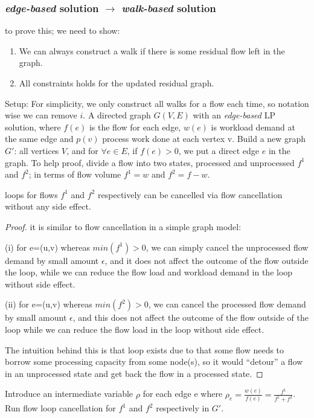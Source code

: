 \subsubsection{\emph{edge-based} solution $\rightarrow$ \emph{walk-based} solution}
to prove this; we need to show:
\begin{enumerate}
 \item We can always construct a walk if there is some residual flow left in the graph.
 \item All constraints holds for the updated residual graph.
 
\end{enumerate}

Setup: 
For simplicity, we only construct all walks for a flow each time, so notation wise we can remove $i$. A directed graph $G(V,E)$ with an \emph{edge-based} LP solution, where $f(e)$ is the flow for each edge, $w(e)$ is workload demand at the same edge and $p(v)$ process work done at each vertex v. Build a new graph $G'$: all vertices $V$, and for $\forall e\in E $, if $f(e) >0$, we put a direct edge $e$ in the graph. To help proof, divide a flow into two states, processed and unprocessed $f^1$ and $f^2$; in terms of flow volume $f^1=w$ and $f^2=f-w$. 
\begin{lemma} loops for flows $f^1$ and $f^2$ respectively can be cancelled via flow cancellation without any side effect. 
\end{lemma} 

\begin{proof} it is similar to flow cancellation in a simple graph model: 

(i) for e=(u,v) whereas $min(f^1) >0$, we can simply cancel the unprocessed flow demand by small amount $\epsilon$, and it does not affect the outcome of the flow outside the loop, while we can reduce the flow load and workload demand in the loop without side effect. 

(ii) for e=(u,v) whereas $min(f^2)>0$, we can cancel the processed flow demand by small amount $\epsilon$, and this does not affect the outcome of the flow outside of the loop while we can reduce the flow load in the loop without side effect. 

The intuition behind this is that loop exists due to that some flow needs to borrow some processing capacity from some node(s), so it would ``detour'' a flow in an unprocessed state and get back the flow in a processed state. 
\end{proof}

Introduce an intermediate variable $\rho$ for each edge e where $\rho_{e} = \frac{w(e)}{f(e)} = \frac{ f^1} {f^1+f^2 }$. Run flow loop cancellation for $f^1$ and $f^2$ respectively in $G'$.


